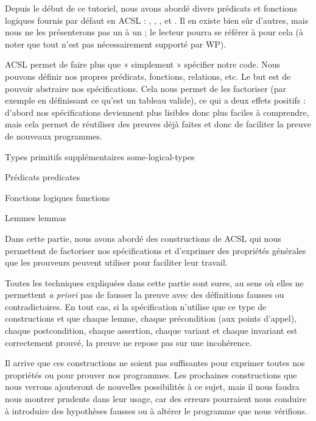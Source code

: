 
Depuis le début de ce tutoriel, nous avons abordé divers prédicats et fonctions
logiques fournis par défaut en ACSL : ,
, ,
 et . Il en existe
bien sûr d'autres, mais nous ne les présenterons pas un à un ; le lecteur pourra
se référer à 
pour cela (à noter que tout n'est pas nécessairement supporté par WP).



ACSL permet de faire plus que « simplement » spécifier notre code. Nous
pouvons définir nos propres prédicats, fonctions, relations, etc. Le but est de
pouvoir abstraire nos spécifications. Cela nous permet de les factoriser (par
exemple en définissant ce qu'est un tableau valide), ce qui a deux effets
positifs : d'abord nos spécifications deviennent plus lisibles donc
plus faciles à comprendre, mais cela permet de réutiliser des preuves
déjà faites et donc de faciliter la preuve de nouveaux programmes.


\begin{levelTwo}
  {Types primitifs supplémentaires}
  {some-logical-types}
\end{levelTwo}

\begin{levelTwo}
  {Prédicats}
  {predicates}
\end{levelTwo}

\begin{levelTwo}
  {Fonctions logiques}
  {functions}
\end{levelTwo}

\begin{levelTwo}
  {Lemmes}
  {lemmas}
\end{levelTwo}



\horizontalLine



Dans cette partie, nous avons abordé des constructions de ACSL qui nous permettent
de factoriser nos spécifications et d'exprimer des propriétés générales
que les prouveurs peuvent utiliser pour faciliter leur travail.



Toutes les techniques expliquées dans cette partie sont sures, au sens où
elles ne permettent \textit{a priori} pas de fausser la preuve avec des définitions
fausses ou contradictoires. En tout cas, si la spécification n'utilise que ce
type de constructions et que chaque lemme, chaque précondition (aux points
d'appel), chaque postcondition, chaque assertion, chaque variant et chaque
invariant est correctement prouvé, la preuve ne repose pas sur une incohérence.



Il arrive que ces constructions ne soient pas suffisantes pour exprimer toutes nos
propriétés ou pour prouver nos programmes. Les prochaines constructions que nous
verrons ajouteront de nouvelles possibilités à ce sujet, mais il
nous faudra nous montrer prudents dans leur usage, car des erreurs pourraient nous
conduire à introduire des hypothèses fausses ou à altérer le programme que nous
vérifions.
